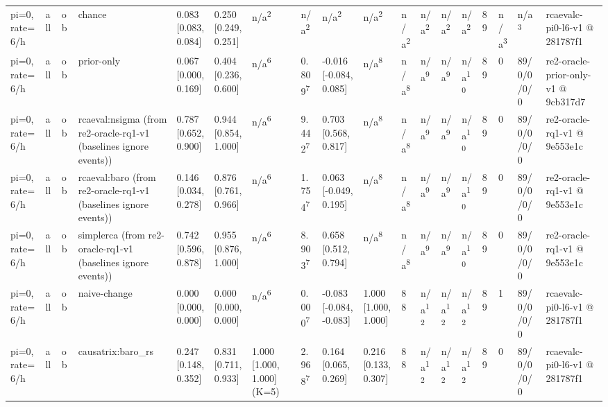 \begin{table}[t]
\begin{tabular}{llllllllllllllllll}
pi=0, rate=6/h & all & ob & chance & 0.083 [0.083, 0.084] & 0.250 [0.249, 0.251] & n/a\textsuperscript{2} & n/a\textsuperscript{2} & n/a\textsuperscript{2} & n/a\textsuperscript{2} & n/a\textsuperscript{2} & n/a\textsuperscript{2} & n/a\textsuperscript{2} & n/a\textsuperscript{2} & 89 & n/a\textsuperscript{3} & n/a\textsuperscript{3} & rcaevalc-pi0-l6-v1 @ 281787f1 \\
pi=0, rate=6/h & all & ob & prior-only & 0.067 [0.000, 0.169] & 0.404 [0.236, 0.600] & n/a\textsuperscript{6} & 0.809\textsuperscript{7} & -0.016 [-0.084, 0.085] & n/a\textsuperscript{8} & n/a\textsuperscript{8} & n/a\textsuperscript{9} & n/a\textsuperscript{9} & n/a\textsuperscript{10} & 89 & 0 & 89/0/0/0/0 & re2-oracle-prior-only-v1 @ 9cb317d7 \\
pi=0, rate=6/h & all & ob & rcaeval:nsigma (from re2-oracle-rq1-v1 (baselines ignore events)) & 0.787 [0.652, 0.900] & 0.944 [0.854, 1.000] & n/a\textsuperscript{6} & 9.442\textsuperscript{7} & 0.703 [0.568, 0.817] & n/a\textsuperscript{8} & n/a\textsuperscript{8} & n/a\textsuperscript{9} & n/a\textsuperscript{9} & n/a\textsuperscript{10} & 89 & 0 & 89/0/0/0/0 & re2-oracle-rq1-v1 @ 9e553e1c \\
pi=0, rate=6/h & all & ob & rcaeval:baro (from re2-oracle-rq1-v1 (baselines ignore events)) & 0.146 [0.034, 0.278] & 0.876 [0.761, 0.966] & n/a\textsuperscript{6} & 1.754\textsuperscript{7} & 0.063 [-0.049, 0.195] & n/a\textsuperscript{8} & n/a\textsuperscript{8} & n/a\textsuperscript{9} & n/a\textsuperscript{9} & n/a\textsuperscript{10} & 89 & 0 & 89/0/0/0/0 & re2-oracle-rq1-v1 @ 9e553e1c \\
pi=0, rate=6/h & all & ob & simplerca (from re2-oracle-rq1-v1 (baselines ignore events)) & 0.742 [0.596, 0.878] & 0.955 [0.876, 1.000] & n/a\textsuperscript{6} & 8.903\textsuperscript{7} & 0.658 [0.512, 0.794] & n/a\textsuperscript{8} & n/a\textsuperscript{8} & n/a\textsuperscript{9} & n/a\textsuperscript{9} & n/a\textsuperscript{10} & 89 & 0 & 89/0/0/0/0 & re2-oracle-rq1-v1 @ 9e553e1c \\
pi=0, rate=6/h & all & ob & naive-change & 0.000 [0.000, 0.000] & 0.000 [0.000, 0.000] & n/a\textsuperscript{6} & 0.000\textsuperscript{7} & -0.083 [-0.084, -0.083] & 1.000 [1.000, 1.000] & 88 & n/a\textsuperscript{12} & n/a\textsuperscript{12} & n/a\textsuperscript{12} & 89 & 1 & 89/0/0/0/0 & rcaevalc-pi0-l6-v1 @ 281787f1 \\
pi=0, rate=6/h & all & ob & causatrix:baro\_rs & 0.247 [0.148, 0.352] & 0.831 [0.711, 0.933] & 1.000 [1.000, 1.000] (K=5) & 2.968\textsuperscript{7} & 0.164 [0.065, 0.269] & 0.216 [0.133, 0.307] & 88 & n/a\textsuperscript{12} & n/a\textsuperscript{12} & n/a\textsuperscript{12} & 89 & 0 & 89/0/0/0/0 & rcaevalc-pi0-l6-v1 @ 281787f1 \\

\end{tabular}
\end{table}
